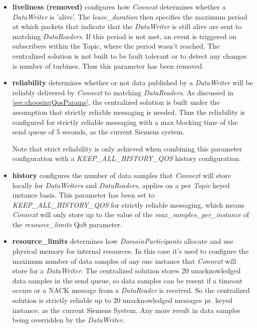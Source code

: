 \begin{itemize}
	\item \textbf{liveliness (removed)} configures how \textit{Connext} determines whether a \textit{DataWriter} is 'alive'. The \textit{lease\_duration} then specifies the maximum period at which packets that indicate that the \textit{DataWriter} is still alive are sent to matching \textit{DataReaders}. If this period is not met, an event is triggered on subscribers within the Topic, where the period wasn't reached. The centralized solution is not built to be fault tolerant or to detect any changes is number of turbines. Thus this parameter has been removed.
	\item \textbf{reliability} determines whether or not data published by a \textit{DataWriter} will be reliably delivered by \textit{Connext} to matching \textit{DataReaders}. As discussed in \cref{sec:choosingQosParams}, the centralized solution is built under the assumption that strictly reliable messaging is needed. Thus the reliability is configured for strictly reliable messaging with a max blocking time of the send queue of 5 seconds, as the current Siemens system.
	
	Note that strict reliability is only achieved when combining this parameter configuration with a \textit{KEEP\_ALL\_HISTORY\_QOS} history configuration.
	\item \textbf{history} configures the number of data samples that \textit{Connext} will store locally for \textit{DataWriters} and \textit{DataReaders}, applies on a per \textit{Topic} keyed instance basis. This parameter has been set to \textit{KEEP\_ALL\_HISTORY\_QOS} for strictly reliable messaging, which means \textit{Connext} will only store up to the value of the \textit{max\_samples\_per\-\_instance} of the \textit{resource\_limits} QoS parameter.
	\item \textbf{resource\_limits} determines how \textit{DomainParticipants} allocate and use physical memory for internal resources. In this case it's used to configure the maximum number of data samples of any one instance that \textit{Connext} will store for a \textit{DataWriter}. The centralized solution stores 20 unacknowledged data samples in the send queue, so data samples can be resent if a timeout occurs or a NACK message from a \textit{DataReader} is received. So the centralized solution is strictly reliable up to 20 unacknowledged messages pr. keyed instance, as the current Siemens System. Any more result in data samples being overridden by the \textit{DataWriter}.
	

\end{itemize}
